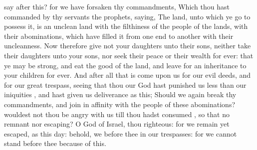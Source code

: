 {say
after this? for we have
forsaken thy
commandments,
Which thou hast
commanded
by thy
servants the
prophets,
saying, The
land, unto which ye
go to
possess it, is an
unclean
land with the
filthiness of the
people of the
lands, with their
abominations, which have
filled it from one
end to
another with their
uncleanness.
Now therefore
give not your
daughters unto their
sons, neither
take their
daughters unto your
sons, nor
seek their
peace or their
wealth
for
ever: that ye may be
strong, and
eat the
good of the
land, and leave
{} for an
inheritance to your
children for
ever.
And
after all that is
come upon us for our
evil
deeds, and for our
great
trespass, seeing that thou our
God hast
punished us
less than our
iniquities
{}, and hast
given us
{}
deliverance as this;
Should we
again
break thy
commandments, and join in
affinity with the
people of these
abominations? wouldest not thou be
angry with us till thou hadst
consumed
{}, so that
{} no
remnant nor
escaping?
O
{}
God of
Israel, thou
{}
righteous: for we
remain yet
escaped, as
{} this
day: behold, we
{}
before thee in our
trespasses: for we cannot
stand
before thee because of this.

}
